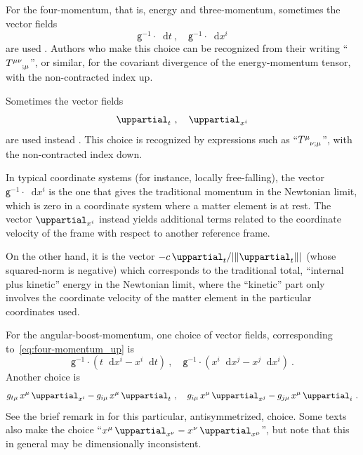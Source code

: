 \documentclass[a4paper,12pt,%
onecolumn,oneside,article,%
british%
]{memoir}
\theoremstyle{remark}
\theoremstyle{innote}
\newcommand*{\mathte}[1]{\bm{\mathsf{#1}}}
\newcommand*{\de}{\mathop{}\!\uppartial}%
\newcommand*{\di}{\mathop{}\!\mathrm{d}}%
\DeclarePairedDelimiter\abs{\lvert}{\rvert}
\renewcommand*{\|}[1][]{\nonscript\:#1\vert\nonscript\:\mathopen{}}
\newcommand*{\sect}{\S}%
\newcommand*{\sects}{\S\S}%
\newcommand*{\chap}{ch.}%
\newcommand*{\eqn}{eq.}%
\renewcommand*{\i}{{}\indices}
\newcommand*{\se}[1]{\de_{#1}}
\newcommand*{\si}[1]{\di{#1}}
\newcommand*{\yg}{\mathte{g}}
\DeclarePairedDelimiter\nor{\lVert}{\rVert}
\begin{document}
For the four-momentum, that is, energy and three-momentum, sometimes the vector fields
\begin{equation}
  \label{eq:four-momentum_up}
  \yg^{-1}\cdot\si{t} \ ,\quad \yg^{-1}\cdot\si{x^{i}}
\end{equation}
are used \autocites[for instance in][\sect~5.3, \chap~20]{misneretal1970_r2017}[\sect~6.1.3]{poissonetal2014}. Authors who make this choice can be recognized from their writing \enquote{$T\i{^{\mu\nu}_{;\mu}}$}, or similar, for the covariant divergence of the energy-momentum tensor, with the non-contracted index up.

Sometimes the vector fields
\begin{equation}
  \label{eq:four-momentum_down}
  \se{t} \ ,\quad \se{x^{i}}
\end{equation}
are used instead \autocites[for instance in][\sect~3.2 after \eqn~(3.2)]{hawkingetal1973_r1994}. This choice is recognized by expressions such as \enquote{$T\i{^{\mu}_{\nu;\mu}}$}, with the non-contracted index down.

In typical coordinate systems (for instance, locally free-falling), the vector $\yg^{-1}\cdot\si{x^{i}}$ is the one that gives the traditional momentum in the Newtonian limit, which is zero in a coordinate system where a matter element is at rest. The vector $\se{x^{i}}$ instead yields additional terms related to the coordinate velocity of the frame with respect to another reference frame.

On the other hand, it is the vector $-c\se{t}/\abs{\nor{\se{t}}}$ (whose squared-norm is negative) which corresponds to the traditional total, \enquote{internal plus kinetic} energy in the Newtonian limit, where the \enquote{kinetic} part only involves the coordinate velocity of the matter element in the particular coordinates used.

For the angular-boost-momentum, one choice of vector fields, corresponding to~\eqref{eq:four-momentum_up} is
\begin{equation}
  \label{eq:ang-momentum_up}
  \yg^{-1}\cdot(t\si{x^{i}} - x^{i}\si{t})
\ ,\quad
  \yg^{-1}\cdot(x^{i}\si{x^{j}} - x^{j}\si{x^{i}}) \ .
\end{equation}
Another choice \autocites[\sect~3.9.6.3 before \eqn~(3.475)]{kopeikinetal2011} is
\begin{equation}
  \label{eq:ang-momentum_down}
  g_{t\mu}\,x^{\mu}\se{x^{i}} - g_{i\mu}\,x^{\mu}\se{t}
\ ,\quad
  g_{i\mu}\,x^{\mu}\se{x^{j}} - g_{j\mu}\,x^{\mu}\se{i} \ .
\end{equation}
See the brief remark in \cites[\sect~2.1.3 p.~160]{dixon1979b} for this particular, antisymmetrized, choice. Some texts \autocites[\sects~III.21, IX.62 p.~385]{burke1985_r1987}[\sect~3.2 after \eqn~(3.2)]{hawkingetal1973_r1994} also make the choice \enquote{$x^{\mu}\se{x^{\nu}} - x^{\nu}\se{x^{\mu}}$}, but note that this in general may be dimensionally inconsistent.
\end{document}

